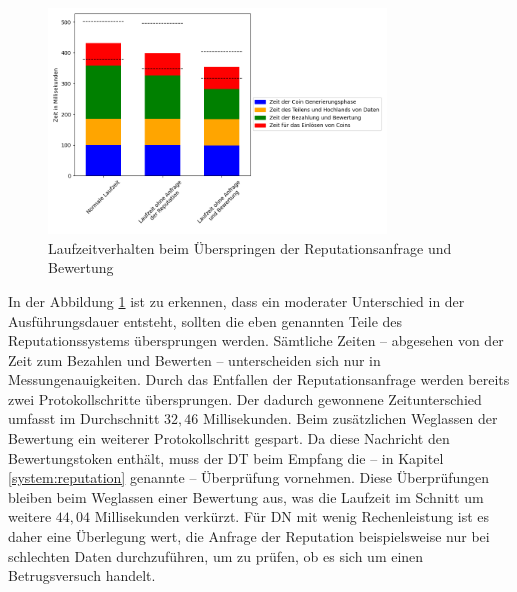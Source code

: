 \documentclass[
	fontsize=11pt,
	headings=small,
	parskip=half,           %
	bibliography=totoc,
	numbers=noenddot,       %
	open=any,               %
]{scrreprt}
\begin{document}
\begin{figure}[h]
    \caption{Laufzeitverhalten beim Überspringen der Reputationsanfrage und Bewertung}
    \label{fig:win_noRep}
    \centering
    \includegraphics[width=0.8\textwidth]{figure_win_noRep_withOnlyOnes.png}
\end{figure}
In der Abbildung \ref{fig:win_noRep} ist zu erkennen, dass ein moderater Unterschied in der Ausführungsdauer entsteht, sollten die eben genannten Teile des Reputationssystems übersprungen werden. Sämtliche Zeiten -- abgesehen von der Zeit zum Bezahlen und Bewerten -- unterscheiden sich nur in Messungenauigkeiten. Durch das Entfallen der Reputationsanfrage werden bereits zwei Protokollschritte übersprungen. Der dadurch gewonnene Zeitunterschied umfasst im Durchschnitt $32,46$ Millisekunden. Beim zusätzlichen Weglassen der Bewertung ein weiterer Protokollschritt gespart. Da diese Nachricht den Bewertungstoken enthält, muss der DT beim Empfang die -- in Kapitel \ref{system:reputation} genannte -- Überprüfung vornehmen. Diese Überprüfungen bleiben beim Weglassen einer Bewertung aus, was die Laufzeit im Schnitt um weitere $44,04$ Millisekunden verkürzt. Für DN mit wenig Rechenleistung ist es daher eine Überlegung wert, die Anfrage der Reputation beispielsweise nur bei schlechten Daten durchzuführen, um zu prüfen, ob es sich um einen Betrugsversuch handelt.
\end{document}
